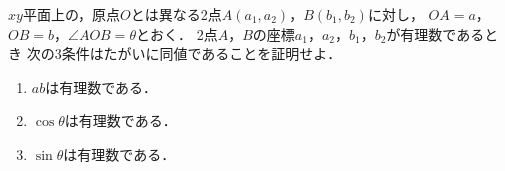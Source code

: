 \documentclass[../../main.tex]{subfiles}
\begin{document}
$xy$平面上の，原点$O$とは異なる2点$A(a_1,a_2)$，$B(b_1,b_2)$に対し，
$OA=a$，$OB=b$，$\angle AOB=\theta$とおく．
2点$A$，$B$の座標$a_1$，$a_2$，$b_1$，$b_2$が有理数であるとき
次の3条件はたがいに同値であることを証明せよ．
\begin{enumerate}
  \item $ab$は有理数である．
  \item $\cos\theta$は有理数である．
  \item $\sin\theta$は有理数である．
\end{enumerate}
\end{document}

